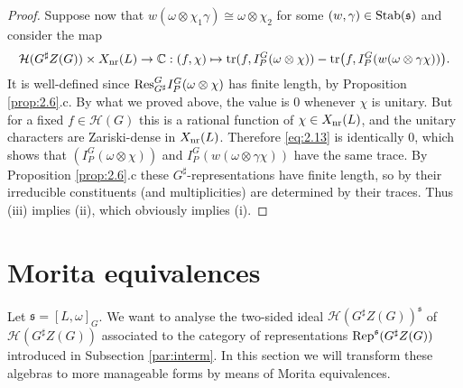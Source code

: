 \documentclass[11pt]{amsart}
\theoremstyle{definition}
\begin{document}
\begin{proof}
Suppose now that $w (\omega \otimes \chi_1 \gamma) \cong \omega \otimes \chi_2$ for some 
$(w,\gamma) \in {{\rm Stab}} ({{\mathfrak s}})$ and consider the map
\begin{equation}\label{eq:2.13}
{{\mathcal H}} (G^\sharp Z(G)) \times X_{{\rm nr}} (L) \to {\mathbb C} : (f,\chi) \mapsto \text{tr}(f,I_P^G 
(\omega \otimes \chi)) - \text{tr} \big( f, I_P^G (w (\omega \otimes \gamma \chi)) \big) .
\end{equation}
It is well-defined since ${{\rm Res}}^G_{G^\sharp}  I_P^G (\omega \otimes \chi)$ has finite length,
by Proposition \ref{prop:2.6}.c.
By what we proved above, the value is 0 whenever $\chi$ is unitary. But for a fixed $f \in {{\mathcal H}} (G)$
this is a rational function of $\chi \in X_{{\rm nr}} (L)$, and the unitary characters are Zariski-dense
in $X_{{\rm nr}} (L)$. Therefore \eqref{eq:2.13} is identically 0, which shows that 
$(I_P^G (\omega \otimes \chi))$ and $I_P^G (w (\omega \otimes \gamma \chi))$ have the same trace.
By Proposition \ref{prop:2.6}.c these $G^\sharp$-representations have finite length, so by 
\cite[2.3.3]{Cas} their irreducible constituents (and multiplicities) are determined by their traces. 
Thus (iii) implies (ii), which obviously implies (i). 
\end{proof}

\section{Morita equivalences}
\label{sec:Mor}

Let ${{\mathfrak s}} = [L,\omega]_G$. We want to analyse the two-sided ideal \label{i: H} ${{\mathcal H}} (G^\sharp Z(G))^{{\mathfrak s}}$ 
of ${{\mathcal H}} (G^\sharp Z(G))$ associated to the category of representations 
${{\rm Rep}}^{{\mathfrak s}} (G^\sharp Z(G))$ introduced in Subsection \ref{par:interm}. In this section we
will transform these algebras to more manageable forms by means of Morita equivalences.
\end{document}
